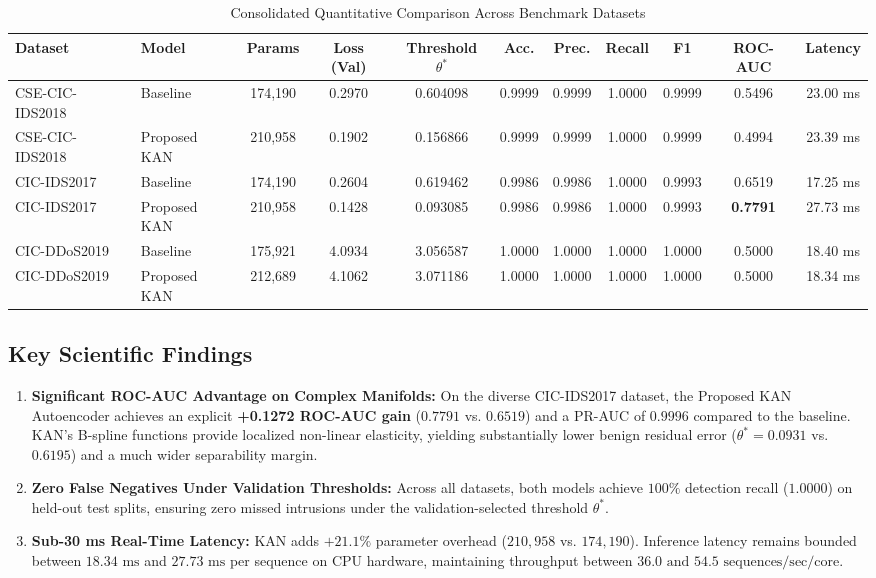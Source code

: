 \documentclass[twocolumn]{article}
\begin{document}
\begin{table}[t]
\centering
\caption{Consolidated Quantitative Comparison Across Benchmark Datasets}
\label{tab:results}
\small
\begin{tabular}{llccccccccc}
\toprule
\textbf{Dataset} & \textbf{Model} & \textbf{Params} & \textbf{Loss (Val)} & \textbf{Threshold $\theta^*$} & \textbf{Acc.} & \textbf{Prec.} & \textbf{Recall} & \textbf{F1} & \textbf{ROC-AUC} & \textbf{Latency} \\
\midrule
CSE-CIC-IDS2018 & Baseline & 174,190 & 0.2970 & 0.604098 & 0.9999 & 0.9999 & 1.0000 & 0.9999 & 0.5496 & 23.00 ms \\
CSE-CIC-IDS2018 & Proposed KAN & 210,958 & 0.1902 & 0.156866 & 0.9999 & 0.9999 & 1.0000 & 0.9999 & 0.4994 & 23.39 ms \\
\midrule
CIC-IDS2017 & Baseline & 174,190 & 0.2604 & 0.619462 & 0.9986 & 0.9986 & 1.0000 & 0.9993 & 0.6519 & 17.25 ms \\
CIC-IDS2017 & Proposed KAN & 210,958 & 0.1428 & 0.093085 & 0.9986 & 0.9986 & 1.0000 & 0.9993 & \textbf{0.7791} & 27.73 ms \\
\midrule
CIC-DDoS2019 & Baseline & 175,921 & 4.0934 & 3.056587 & 1.0000 & 1.0000 & 1.0000 & 1.0000 & 0.5000 & 18.40 ms \\
CIC-DDoS2019 & Proposed KAN & 212,689 & 4.1062 & 3.071186 & 1.0000 & 1.0000 & 1.0000 & 1.0000 & 0.5000 & 18.34 ms \\
\bottomrule
\end{tabular}
\end{table}

\subsection{Key Scientific Findings}
\begin{enumerate}
    \item \textbf{Significant ROC-AUC Advantage on Complex Manifolds:} On the diverse CIC-IDS2017 dataset, the Proposed KAN Autoencoder achieves an explicit \textbf{+0.1272 ROC-AUC gain} ($0.7791$ vs. $0.6519$) and a PR-AUC of $0.9996$ compared to the baseline. KAN's B-spline functions provide localized non-linear elasticity, yielding substantially lower benign residual error ($\theta^* = 0.0931$ vs. $0.6195$) and a much wider separability margin.
    \item \textbf{Zero False Negatives Under Validation Thresholds:} Across all datasets, both models achieve $100\%$ detection recall ($1.0000$) on held-out test splits, ensuring zero missed intrusions under the validation-selected threshold $\theta^*$.
    \item \textbf{Sub-30 ms Real-Time Latency:} KAN adds $+21.1\%$ parameter overhead ($210,958$ vs. $174,190$). Inference latency remains bounded between $18.34\text{ ms}$ and $27.73\text{ ms}$ per sequence on CPU hardware, maintaining throughput between $36.0\text{ and }54.5\text{ sequences/sec/core}$.
\end{enumerate}
\end{document}
